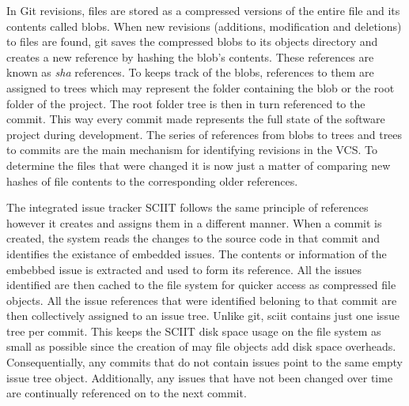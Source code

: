 \documentclass{mproj}
\begin{document}

In Git revisions, files are stored as a compressed versions of the entire file and its contents called blobs. When new revisions (additions, modification and deletions) to files are found, git saves the compressed blobs to its objects directory and creates a new reference by hashing the blob's contents. These references are known as \textit{sha} references. To keeps track of the blobs, references to them are assigned to trees which may represent the folder containing the blob or the root folder of the project.  The root folder tree is then in turn referenced to the commit. This way every commit made represents the full state of the software project during development. The series of references from blobs to trees and trees to commits are the main mechanism for identifying revisions in the VCS. To determine the files that were changed it is now just a matter of comparing new hashes of file contents to the corresponding older references.


The integrated issue tracker SCIIT follows the same principle of references however it creates and assigns them in a different manner. When a commit is created, the system reads the changes to the source code in that commit and identifies the existance of embedded issues. The contents or information of the embebbed issue is extracted and used to form its reference. All the issues identified are then cached to the file system for quicker access as compressed file objects. All the issue references that were identified beloning to that commit are then collectively assigned to an issue tree. Unlike git, sciit contains just one issue tree per commit. This keeps the SCIIT disk space usage on the file system as small as possible since the creation of may file objects add disk space overheads. Consequentially, any commits that do not contain issues point to the same empty issue tree object. Additionally, any issues that have not been changed over time are continually referenced on to the next commit.
\end{document}

